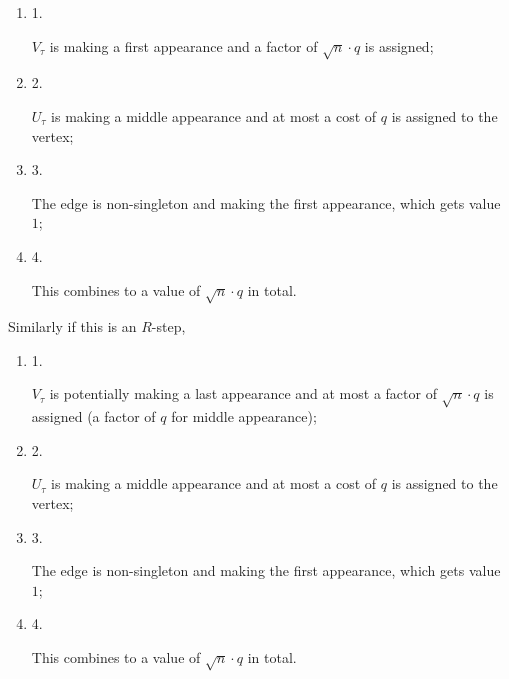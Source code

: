 \begin{enumerate}


\item[] 
1. 


$V_{\tau}$ is making a first appearance and a factor of $\sqrt{n}\cdot q$ is assigned;\par





\item[] 
2. 


$U_{\tau}$ is making a middle appearance and at most a cost of $q$ is assigned to the vertex;\par





\item[] 
3. 


The edge is non-singleton and making the first appearance, which gets value $1$;\par





\item[] 
4. 


This combines to a value of $\sqrt{n}\cdot q$ in total.\par





\end{enumerate}


Similarly if this is an $R$-step,\par


\begin{enumerate}


\item[] 
1. 


$V_{\tau}$ is potentially making a last appearance and at most a factor of $\sqrt{n}\cdot q$ is assigned (a factor of $q$ for middle appearance);\par





\item[] 
2. 


$U_{\tau}$ is making a middle appearance and at most a cost of $q$ is assigned to the vertex;\par





\item[] 
3. 


The edge is non-singleton and making the first appearance, which gets value $1$;\par





\item[] 
4. 


This combines to a value of $\sqrt{n}\cdot q$ in total.\par





\end{enumerate}


